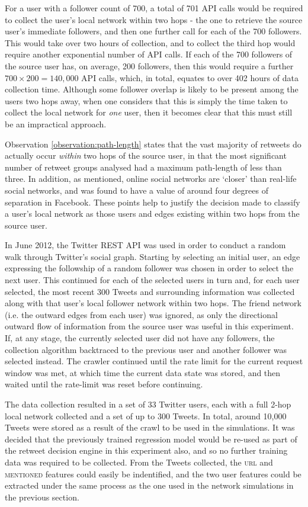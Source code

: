 For a user with a follower count of 700, a total of 701 API calls would be required to collect the user's local network within two hops - the one to retrieve the source user's immediate followers, and then one further call for each of the 700 followers. This would take over two hours of collection, and to collect the third hop would require another exponential number of API calls. If each of the 700 followers of the source user has, on average, 200 followers, then this would require  a further $700 \times 200 = 140,000$ API calls, which, in total, equates to over 402 hours of data collection time. Although some follower overlap is likely to be present among the users two hops away, when one considers that this is simply the time taken to collect the local network for \textit{one} user, then it becomes clear that this must still be an impractical approach.

Observation \ref{observation:path-length} states that the vast majority of retweets do actually occur \textit{within} two hops of the source user, in that the most significant number of retweet groups analysed had a maximum path-length of less than three. In addition, as mentioned, online social networks are `closer' than real-life social networks, and was found to have a value of around four degrees of separation in Facebook. These points help to justify the decision made to classify a user's local network as those users and edges existing within two hops from the source user.

In June 2012, the Twitter REST API was used in order to conduct a random walk through Twitter's social graph. Starting by selecting an initial user, an edge expressing the followship of a random follower was chosen in order to select the next user. This continued for each of the selected users in turn and, for each user selected, the most recent 300 Tweets and surrounding information was collected along with that user's local follower network within two hops. The friend network (i.e. the outward edges from each user) was ignored, as only the directional outward flow of information from the source user was useful in this experiment. If, at any stage, the currently selected user did not have any followers, the collection algorithm backtraced to the previous user and another follower was selected instead. The crawler continued until the rate limit for the current request window was met, at which time the current data state was stored, and then waited until the rate-limit was reset before continuing.

The data collection resulted in a set of 33 Twitter users, each with a full 2-hop local network collected and a set of up to 300 Tweets. In total, around 10,000 Tweets were stored as a result of the crawl to be used in the simulations. It was decided that the previously trained regression model would be re-used as part of the retweet decision engine in this experiment also, and so no further training data was required to be collected. From the Tweets collected, the \textsc{url} and \textsc{mentioned} features could easily be indentified, and the two user features could be extracted under the same process as the one used in the network simulations in the previous section.

